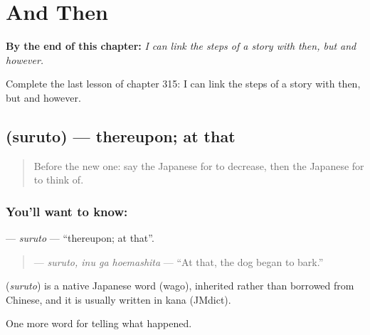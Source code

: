
\chapter{And Then}
\label{ch:ja-and-then}

\begin{chapteropening}
\textbf{By the end of this chapter:} \emph{I can link the steps of a story with then, but and however.}

Complete the last lesson of chapter 315: I can link the steps of a story with then, but and however.
\end{chapteropening}

\section[\texorpdfstring{\ja{すると} (suruto)}{すると (suruto)}]{ (suruto) — thereupon; at that}

\label{lesson:JA-C315-suruto}



\begin{quote}
Before the new one: say the Japanese for to decrease, then the Japanese for to think of.
\end{quote}

\subsection*{You'll want to know: }
\textbf{} — \emph{suruto} — \textquotedblleft{}thereupon; at that\textquotedblright{}.

\begin{quote}
\textbf{ } — \emph{suruto, inu ga hoemashita} — \textquotedblleft{}At that, the dog began to bark.\textquotedblright{}
\end{quote}

\begin{cousinweb}
\textbf{} (\emph{suruto}) is a native Japanese word (wago), inherited rather than borrowed from Chinese, and it is usually written in kana (JMdict).
\end{cousinweb}

\begin{grammarlens}[title={What you've built}]
One more word for telling what happened.
\end{grammarlens}

